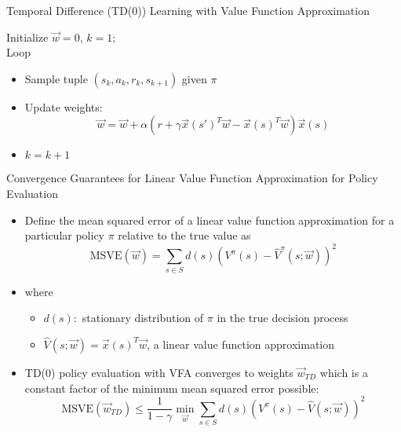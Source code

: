 \begin{frame}[c]{Temporal Difference (TD(0)) Learning with Value
		Function Approximation}

Initialize $\vec{w}= 0$, $k=1$;\\
Loop
	\begin{itemize}
		\item Sample tuple $(s_k, a_k, r_k, s_{k+1})$ given $\pi$
		\item Update weights:
		$$ \vec{w} = \vec{w} + \alpha( r + \gamma \vec{x}(s')^T \vec{w} - \vec{x}(s)^T\vec{w}) \vec{x}(s) $$
		\item $k = k + 1$
	\end{itemize}

\end{frame}
\begin{frame}[c]{Convergence Guarantees for Linear Value Function
		Approximation for Policy Evaluation}
	
\begin{itemize}
	\item Define the mean squared error of a linear value function
	approximation for a particular policy $\pi$ relative to the true value as
	$$\text{MSVE}(\vec{w}) = \sum_{s\in S} d(s) (V^\pi(s) - \hat{V}^\pi (s;\vec{w}))^2$$
	\item where
	\begin{itemize}
		\item $d(s):$ stationary distribution of $\pi$ in the true decision process
		\item $\hat{V}(s;\vec{w}) = \vec{x}(s)^T \vec{w}$, a linear value function approximation
	\end{itemize}
	\item TD(0) policy evaluation with VFA converges to weights $\vec{w}_{TD}$ which is a constant factor of the minimum mean squared error possible:
	$$\text{MSVE}(\vec{w}_{TD}) \leq \frac{1}{1-\gamma} \min_\vec{w}\sum_{s\in S} d(s) (V^\pi(s) - \hat{V}(s;\vec{w}))^2$$
\end{itemize}

	
\end{frame}

